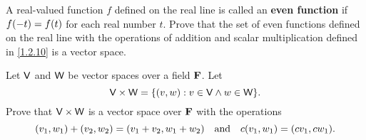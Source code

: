 \begin{ex}\label{ex:1.2.12}
    A real-valued function \(f\) defined on the real line is called an \textbf{even function} if \(f\p{-t} = f\p{t}\) for each real number \(t\).
    Prove that the set of even functions defined on the real line with the operations of addition and scalar multiplication defined in \cref{1.2.10} is a vector space.
\end{ex}

\setcounter{ex}{20}
\begin{ex}\label{ex:1.2.21}
    Let \(\mathsf{V}\) and \(\mathsf{W}\) be vector spaces over a field \(\mathbf{F}\).
    Let
    \[
        \V \times \W = \set{\p{v, w} : v \in \V \land w \in \W}.
    \]
    Prove that \(\mathsf{V} \times \mathsf{W}\) is a vector space over \(\mathbf{F}\) with the operations
    \[
        \p{v_1, w_1} + \p{v_2, w_2} = \p{v_1 + v_2, w_1 + w_2} \quad \text{and} \quad c\p{v_1, w_1} = \p{cv_1, cw_1}.
    \]
\end{ex}

